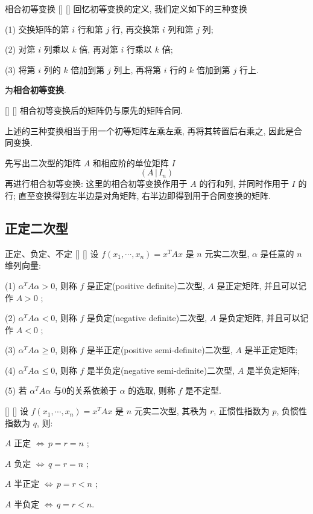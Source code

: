 \documentclass[UTF8]{ctexart}
\DeclareMathOperator{\0}{\mathbf{0}}
\DeclareMathOperator{\<}{\langle}
\renewcommand{\>}{\rangle}
\begin{document}
		\begin{dfn}
			[]
			{相合初等变换}
			[]
			[]
			回忆初等变换的定义, 我们定义如下的三种变换

			(1) 交换矩阵的第 \(i\) 行和第 \(j\) 行, 再交换第 \(i\) 列和第 \(j\) 列; 

			(2) 对第 \(i\) 列乘以 \(k\) 倍, 再对第 \(i\) 行乘以 \(k\) 倍; 

			(3) 将第 \(i\) 列的 \(k\) 倍加到第 \(j\) 列上, 再将第 \(i\) 行的 \(k\) 倍加到第 \(j\) 行上. 

			为\textbf{相合初等变换}.
		\end{dfn}
		\begin{thm}
			[]
			{}
			[]
			[]
			相合初等变换后的矩阵仍与原先的矩阵合同. 
		\end{thm}
		\begin{prf}
			上述的三种变换相当于用一个初等矩阵左乘左乘, 再将其转置后右乘之, 因此是合同变换. 
		\end{prf}

		先写出二次型的矩阵 \(A\) 和相应阶的单位矩阵 \(I\)  \[(A\,|\,I_n)
		\]
		再进行相合初等变换: 这里的相合初等变换作用于 \(A\) 的行和列, 并同时作用于 \(I\) 的行; 直至变换得到左半边是对角矩阵, 右半边即得到用于合同变换的矩阵.



	\subsection{正定二次型}
		
		\begin{dfn}
			[]
			{正定、负定、不定}
			[]
			[]
			设 \(f(x_1,\cdots,x_n)=x^{T}Ax\) 是 \(n\) 元实二次型,  \(\alpha\) 是任意的 \(n\) 维列向量: 

			(1)  \(\alpha^{T}A\alpha>0\), 则称 \(f\) 是正定(positive definite)二次型,  \(A\) 是正定矩阵, 并且可以记作 \(A>0\) ; 

			(2)  \(\alpha^{T}A\alpha<0\), 则称 \(f\) 是负定(negative definite)二次型,  \(A\) 是负定矩阵, 并且可以记作 \(A<0\) ; 

			(3)  \(\alpha^{T}A\alpha\geq  0\), 则称 \(f\) 是半正定(positive semi-definite)二次型,  \(A\) 是半正定矩阵; 

			(4)  \(\alpha^{T}A\alpha\leq 0\), 则称 \(f\) 是半负定(negative semi-definite)二次型,  \(A\) 是半负定矩阵; 

			(5) 若 \(\alpha^{T}A\alpha\) 与0的关系依赖于 \(\alpha\) 的选取, 则称 \(f\) 是不定型.
		\end{dfn}

		\begin{ppt}
			[]
			{}
			[]
			[]
			设 \(f(x_1,\cdots,x_n)=x^{T}Ax\) 是 \(n\) 元实二次型, 其秩为 \(r\), 正惯性指数为 \(p\), 负惯性指数为 \(q\), 则: 

			 \(A\) 正定 \(\iff\,p=r=n\) ;

			 \(A\) 负定 \(\iff\,q=r=n\) ;

			 \(A\) 半正定 \(\iff\,p=r<n\) ;

			 \(A\) 半负定 \(\iff\,q=r<n\).
		\end{ppt}
\end{document}
